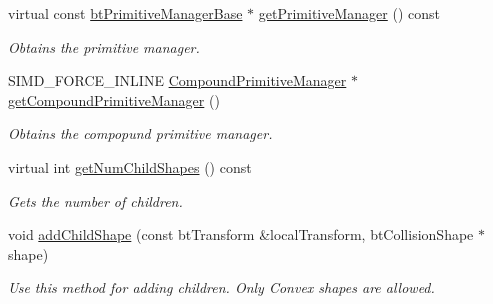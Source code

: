 \begin{DoxyCompactItemize}
\mbox{\label{classbtGImpactCompoundShape_ac27e9ff4012de1dd02d8e58ba9f4533d}} 
virtual const \hyperlink{classbtPrimitiveManagerBase}{bt\+Primitive\+Manager\+Base} $\ast$ \hyperlink{classbtGImpactCompoundShape_ac27e9ff4012de1dd02d8e58ba9f4533d}{get\+Primitive\+Manager} () const
\begin{DoxyCompactList}\small\item\em Obtains the primitive manager. \end{DoxyCompactList}\item 
\mbox{\label{classbtGImpactCompoundShape_a5608f37c18454c3e82504120e053f67a}} 
S\+I\+M\+D\+\_\+\+F\+O\+R\+C\+E\+\_\+\+I\+N\+L\+I\+NE \hyperlink{classbtGImpactCompoundShape_1_1CompoundPrimitiveManager}{Compound\+Primitive\+Manager} $\ast$ \hyperlink{classbtGImpactCompoundShape_a5608f37c18454c3e82504120e053f67a}{get\+Compound\+Primitive\+Manager} ()
\begin{DoxyCompactList}\small\item\em Obtains the compopund primitive manager. \end{DoxyCompactList}\item 
\mbox{\label{classbtGImpactCompoundShape_ae0673a0cf5bb33ed1e3b18b3c2565811}} 
virtual int \hyperlink{classbtGImpactCompoundShape_ae0673a0cf5bb33ed1e3b18b3c2565811}{get\+Num\+Child\+Shapes} () const
\begin{DoxyCompactList}\small\item\em Gets the number of children. \end{DoxyCompactList}\item 
\mbox{\label{classbtGImpactCompoundShape_a3c97aab1f6511033df73007096ed4c8a}} 
void \hyperlink{classbtGImpactCompoundShape_a3c97aab1f6511033df73007096ed4c8a}{add\+Child\+Shape} (const bt\+Transform \&local\+Transform, bt\+Collision\+Shape $\ast$shape)
\begin{DoxyCompactList}\small\item\em Use this method for adding children. Only Convex shapes are allowed. \end{DoxyCompactList}\item 
\mbox{\label{classbtGImpactCompoundShape_a106e3d9999c847a9748c962378ab3f46}} 

\end{DoxyCompactItemize}
